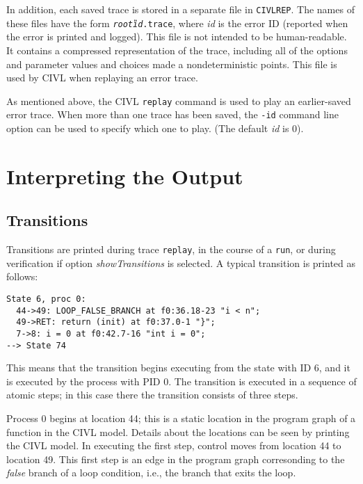 In addition, each saved trace is stored in a separate file in
\texttt{CIVLREP}.  The names of these files have the form
\texttt{\textit{root}{\U}\textit{id}.trace}, where \textit{id} is the
error ID (reported when the error is printed and logged).  This file
is not intended to be human-readable.  It contains a compressed
representation of the trace, including all of the options and
parameter values and choices made a nondeterministic points.  
This file is used by CIVL when replaying an error trace.

As mentioned above, the CIVL \texttt{replay} command is used to play
an earlier-saved error trace.  When more than one trace has been
saved, the \texttt{-id} command line option can be used to specify
which one to play. (The default \emph{id} is 0).

\chapter{Interpreting the Output}

\section{Transitions}

Transitions are printed during trace \texttt{replay}, in the course of
a \texttt{run}, or during verification if option
\emph{showTransitions} is selected.  A typical transition is printed
as follows:

\begin{verbatim}
State 6, proc 0: 
  44->49: LOOP_FALSE_BRANCH at f0:36.18-23 "i < n";
  49->RET: return (init) at f0:37.0-1 "}";
  7->8: i = 0 at f0:42.7-16 "int i = 0";
--> State 74
\end{verbatim}

This means that the transition begins executing from the state with
ID 6, and it is executed by the process with PID 0.  The transition
is executed in a sequence of atomic steps; in this case there the
transition consists of three steps.

Process 0 begins at location 44; this is a static location in the
program graph of a function in the CIVL model.  Details about the
locations can be seen by printing the CIVL model.  In executing the
first step, control moves from location 44 to location 49.  This first
step is an edge in the program graph corresonding to the \emph{false}
branch of a loop condition, i.e., the branch that exits the loop.

